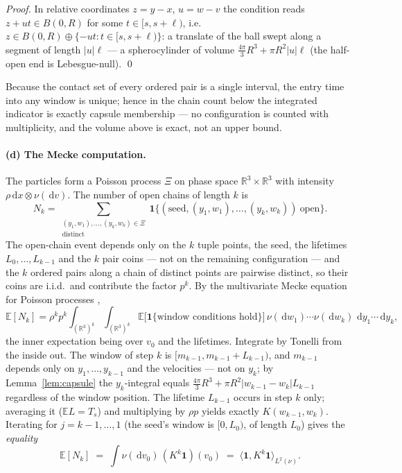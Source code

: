 \documentclass[11pt]{article}
\newcommand{\dd}{\,\mathrm{d}}
\newcommand{\E}{\mathbb{E}}
\newcommand{\R}{\mathbb{R}}
\newcommand{\Ts}{T_s}
\begin{document}
\noindent\emph{Proof.} In relative coordinates $z=y-x$, $u=w-v$ the
condition reads $z+ut\in B(0,R)$ for some $t\in[s,s+\ell)$, i.e.\
$z\in B(0,R)\oplus\{-ut:t\in[s,s+\ell)\}$: a translate of the ball swept
along a segment of length $|u|\ell$ --- a spherocylinder of volume
$\frac{4\pi}{3}R^3+\pi R^2|u|\ell$ (the half-open end is Lebesgue-null).
\qed

\smallskip
Because the contact set of every ordered pair is a single interval, the
entry time into any window is unique; hence in the chain count below the
integrated indicator is exactly capsule membership --- no configuration is
counted with multiplicity, and the volume above is exact, not an upper
bound.

\paragraph{(d) The Mecke computation.}
The particles form a Poisson process $\Xi$ on phase space
$\R^3\times\R^3$ with intensity $\rho\dd x\otimes\nu(\dd v)$. The number of
open chains of length $k$ is
\[
  N_k=\sum_{\substack{(y_1,w_1),\dots,(y_k,w_k)\in\Xi\\ \text{distinct}}}
  \mathbf 1\bigl\{(\text{seed},(y_1,w_1),\dots,(y_k,w_k))\ \text{open}\bigr\}.
\]
The open-chain event depends only on the $k$ tuple points, the seed, the
lifetimes $L_0,\dots,L_{k-1}$ and the $k$ pair coins --- not on the
remaining configuration --- and the $k$ ordered pairs along a chain of
distinct points are pairwise distinct, so their coins are i.i.d.\ and
contribute the factor $p^k$. By the multivariate Mecke equation for Poisson
processes \cite{lastpenrose},
\[
  \E[N_k]=\rho^k p^k\int_{(\R^3)^k}\!\!\int_{(\R^3)^k}
  \E\bigl[\mathbf 1\{\text{window conditions hold}\}\bigr]
  \,\nu(\dd w_1)\cdots\nu(\dd w_k)\,\dd y_1\cdots\dd y_k,
\]
the inner expectation being over $v_0$ and the lifetimes. Integrate by
Tonelli from the inside out. The window of step $k$ is
$[m_{k-1},m_{k-1}+L_{k-1})$, and $m_{k-1}$ depends only on
$y_1,\dots,y_{k-1}$ and the velocities --- not on $y_k$; by
Lemma~\ref{lem:capsule} the $y_k$-integral equals
$\frac{4\pi}{3}R^3+\pi R^2|w_{k-1}-w_k|L_{k-1}$ regardless of the window
position. The lifetime $L_{k-1}$ occurs in step $k$ only; averaging it
($\E L=\Ts$) and multiplying by $\rho p$ yields exactly
$K(w_{k-1},w_k)$. Iterating for $j=k-1,\dots,1$ (the seed's window is
$[0,L_0)$, of length $L_0$) gives the \emph{equality}
\[
  \E[N_k]\;=\;\int\nu(\dd v_0)\,(K^k\mathbf 1)(v_0)
  \;=\;\langle\mathbf 1,K^k\mathbf 1\rangle_{L^2(\nu)} .
\]
\end{document}
